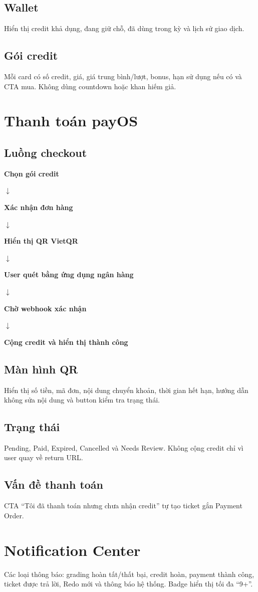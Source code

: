 \documentclass[11pt,a4paper]{article}
\newcommand{\flowarrow}{\par\centering\sffamily\color{BandBlue}\Large$\downarrow$\par}
\newcommand{\flowstep}[1]{\par\centering\sffamily\bfseries #1\par}
\begin{document}
\subsection{Wallet}
Hiển thị credit khả dụng, đang giữ chỗ, đã dùng trong kỳ và lịch sử giao dịch.

\subsection{Gói credit}
Mỗi card có số credit, giá, giá trung bình/lượt, bonus, hạn sử dụng nếu có và CTA mua. Không dùng countdown hoặc khan hiếm giả.

\section{Thanh toán payOS}

\subsection{Luồng checkout}
\begin{flowbox}
\flowstep{Chọn gói credit}
\flowarrow
\flowstep{Xác nhận đơn hàng}
\flowarrow
\flowstep{Hiển thị QR VietQR}
\flowarrow
\flowstep{User quét bằng ứng dụng ngân hàng}
\flowarrow
\flowstep{Chờ webhook xác nhận}
\flowarrow
\flowstep{Cộng credit và hiển thị thành công}
\end{flowbox}

\subsection{Màn hình QR}
Hiển thị số tiền, mã đơn, nội dung chuyển khoản, thời gian hết hạn, hướng dẫn không sửa nội dung và button kiểm tra trạng thái.

\subsection{Trạng thái}
Pending, Paid, Expired, Cancelled và Needs Review. Không cộng credit chỉ vì user quay về return URL.

\subsection{Vấn đề thanh toán}
CTA ``Tôi đã thanh toán nhưng chưa nhận credit'' tự tạo ticket gắn Payment Order.

\section{Notification Center}
Các loại thông báo: grading hoàn tất/thất bại, credit hoàn, payment thành công, ticket được trả lời, Redo mới và thông báo hệ thống. Badge hiển thị tối đa ``9+''.
\end{document}
